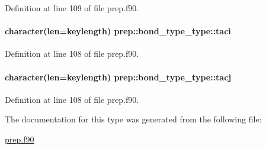 Definition at line 109 of file prep.\-f90.

\hypertarget{structprep_1_1bond__type__type_a75c4d9182bee90121ac0042f83279676}{
\paragraph[{taci}]{\setlength{\rightskip}{0pt plus 5cm}character(len=keylength) prep\-::bond\-\_\-type\-\_\-type\-::taci}}\label{structprep_1_1bond__type__type_a75c4d9182bee90121ac0042f83279676}


Definition at line 108 of file prep.\-f90.

\hypertarget{structprep_1_1bond__type__type_ad80305190249c5b39d5ae892a8e55eba}{
\paragraph[{tacj}]{\setlength{\rightskip}{0pt plus 5cm}character(len=keylength) prep\-::bond\-\_\-type\-\_\-type\-::tacj}}\label{structprep_1_1bond__type__type_ad80305190249c5b39d5ae892a8e55eba}


Definition at line 108 of file prep.\-f90.



The documentation for this type was generated from the following file\-:\begin{DoxyCompactItemize}
\item 
\hyperlink{prep_8f90}{prep.\-f90}\end{DoxyCompactItemize}
